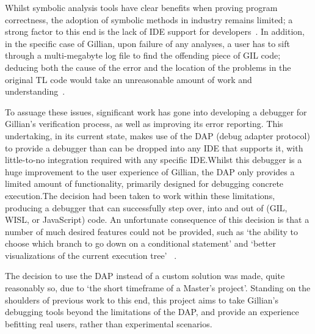 Whilst symbolic analysis tools have clear benefits when proving program
correctness, the adoption of symbolic methods in industry remains limited; a
strong factor to this end is the lack of IDE support for
developers~\cite{magpiebridge}.
In addition, in the specific case of Gillian, upon failure of any analyses, a
user has to sift through a multi-megabyte log file to find the offending piece
of GIL code; deducing both the cause of the error and the location of the
problems in the original TL code would take an unreasonable amount of work and
understanding~\cite{gillian-debugging-2021}.

To assuage these issues, significant work has gone into developing a debugger
for Gillian's verification process, as well as improving its error reporting.
This undertaking, in its current state, makes use of the DAP (debug adapter
protocol) to provide a debugger than can be dropped into any IDE that supports
it, with little-to-no integration required with any specific IDE.\@ Whilst this
debugger is a huge improvement to the user experience of Gillian, the DAP only
provides a limited amount of functionality, primarily designed for debugging
concrete execution.\@ The decision had been taken to work within these
limitations, producing a debugger that can successfully step over, into and out
of (GIL, WISL, or JavaScript) code. An unfortunate consequence of this decision
is that a number of much desired features could not be provided, such as `the
ability to choose which branch to go down on a conditional statement' and
`better visualizations of the current execution tree'
~\cite[p.~49]{gillian-debugging-2021}.

The decision to use the DAP instead of a custom solution was made, quite
reasonably so, due to `the short timeframe of a Master's project'. Standing on
the shoulders of previous work to this end, this project aims to take Gillian's
debugging tools beyond the limitations of the DAP, and provide an experience
befitting real users, rather than experimental scenarios. 
